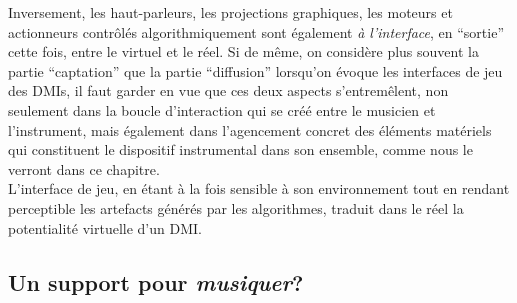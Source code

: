 \indent Inversement, les haut-parleurs, les projections graphiques, les moteurs et actionneurs contrôlés algorithmiquement sont également \textit{à l'interface}, en ``sortie'' cette fois, entre le virtuel et le réel. Si de même, on considère plus souvent la partie ``captation'' que la partie ``diffusion'' lorsqu'on évoque les interfaces de jeu des \glspl{DMI}, il faut garder en vue que ces deux aspects s'entremêlent, non seulement dans la boucle d'interaction qui se créé entre le musicien et l'instrument, mais également dans l'agencement concret des éléments matériels qui constituent le dispositif instrumental dans son ensemble, comme nous le verront dans ce chapitre.\\
\indent L'interface de jeu, en étant à la fois sensible à son environnement tout en rendant perceptible les artefacts générés par les algorithmes, traduit dans le réel la potentialité virtuelle d'un \gls{DMI}.


\subsection{Un support pour \textit{musiquer}?}


